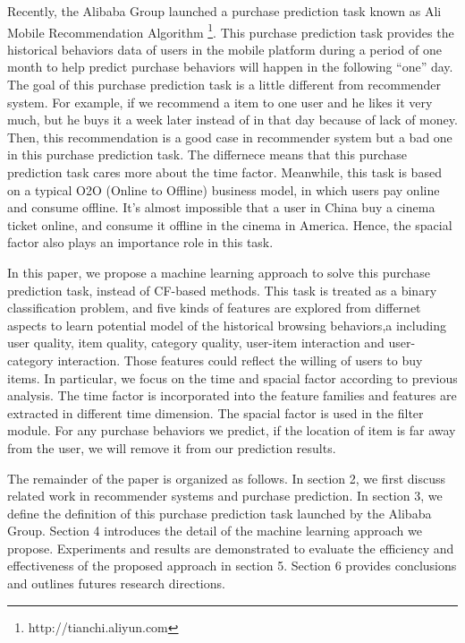 \documentclass{llncs}
\begin{document}
Recently, the Alibaba Group launched a purchase prediction task known as
Ali Mobile Recommendation Algorithm \footnote{http://tianchi.aliyun.com}.
This purchase prediction task provides the historical behaviors data of users
in the mobile platform during a period of one month
to help predict purchase behaviors will happen in the following ``one'' day.
The goal of this purchase prediction task is a little different from recommender system.
For example, if we recommend a item to one user and he likes it very much,
but he buys it a week later instead of in that day because of lack of money.
Then, this recommendation is a good case in recommender system
but a bad one in this purchase prediction task.
The differnece means that this purchase prediction
task cares more about the time factor.
Meanwhile, this task is based on
a typical O2O (Online to Offline) business model,
in which users pay online and consume offline.
It's almost impossible that a user in China buy a cinema ticket online,
and consume it offline in the cinema in America.
Hence, the spacial factor also plays an importance role in this task.

In this paper,
we propose a machine learning approach to solve this purchase prediction task,
instead of CF-based methods.
This task is treated as a binary classification problem,
and five kinds of features are explored from differnet aspects
to learn potential model of the historical browsing behaviors,a
including user quality, item quality, category quality,
user-item interaction and user-category interaction.
Those features could reflect the willing of users to buy items.
In particular, we focus on the time and spacial factor according to previous analysis.
The time factor is incorporated into the feature families
and features are extracted in different time dimension.
The spacial factor is used in the filter module.
For any purchase behaviors we predict, if the location of item
is far away from the user, we will remove it from our prediction results.

The remainder of the paper is organized as follows.
In section 2, we first discuss related work
in recommender systems and purchase prediction.
In section 3, we define the definition of
this purchase prediction task launched by the Alibaba Group.
Section 4 introduces the detail of the machine learning approach we propose.
Experiments and results are demonstrated to evaluate the efficiency
and effectiveness of the proposed approach in section 5.
Section 6 provides conclusions and outlines futures research directions.
\end{document}
